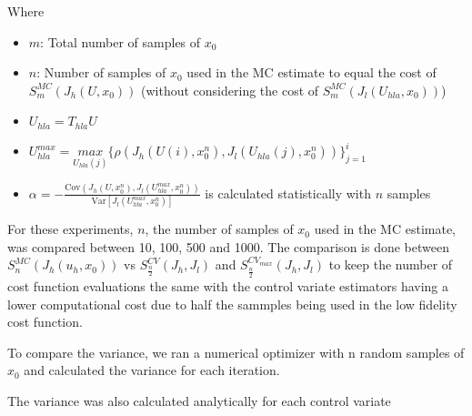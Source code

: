 \documentclass{article}
\begin{document}
Where
\begin{itemize}
  \item $m$: Total number of samples of $x_0$
  \item $n$: Number of samples of $x_0$ used in the MC estimate to equal the cost of $S_m^{MC}(J_h(U, x_0))$ (without considering the cost of $S_m^{MC}(J_l(U_{hla}, x_0))$)
  \item $U_{hla} = T_{hla} U$
  \item $U_{hla}^{max} = \underset{U_{hla}(j)}{max} \{\rho(J_h(U(i), x_0^n), J_l(U_{hla}(j), x_0^n))\}_{j=1}^i$
  \item $\alpha = -\frac{\text{Cov}(J_h(U, x_0^n), J_l(U_{hla}^{max}, x_0^n))}{\text{Var}[J_l(U_{hla}^{max}, x_0^n)]}$ is calculated statistically with $n$ samples
\end{itemize}

For these experiments, $n$, the number of samples of $x_0$ used in the MC estimate, was compared between 10, 100, 500 and 1000.
The comparison is done between $S_n^{MC}(J_h(u_h, x_0))$ vs $S_{\frac{n}{2}}^{CV}(J_h, J_l)$ and $S_{\frac{n}{2}}^{CV_{max}}(J_h, J_l)$ to keep the number of cost function evaluations the same with the control variate estimators having a lower computational cost due to half the sammples being used in the low fidelity cost function.

To compare the variance, we ran a numerical optimizer with n random samples of $x_0$ and calculated the variance for each iteration.

The variance was also calculated analytically for each control variate
\end{document}
